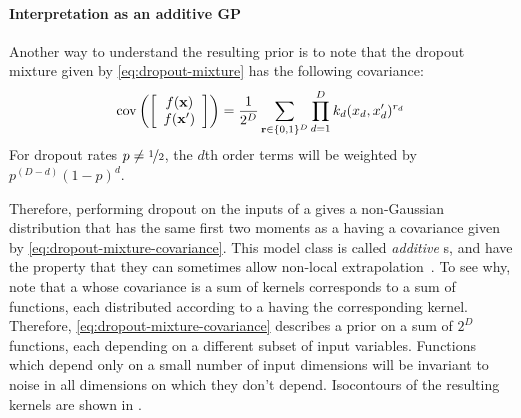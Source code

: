 \documentclass{article} %
\begin{document}
\paragraph{Interpretation as an additive GP}
Another way to understand the resulting prior is to note that the dropout mixture given by \cref{eq:dropout-mixture} has the following covariance:%
%
\begin{align}
\operatorname{cov}\left( \left[ \begin{array}{c} {f({\bf{x}})} \\ {f({\bf{x}}')} \end{array} \right] \right) = \frac{1}{2^{D}} \sum_{{\bf{r}} \in \{0,1\}^D}  \prod_{d=1}^D k_d(x_d, x_d')^{r_d}
\label{eq:dropout-mixture-covariance}
\end{align}
%
For dropout rates $p \neq \nicefrac{1}{2}$, the $d$th order terms will be weighted by $p^{(D - d)}(1-p)^d$.

Therefore, performing dropout on the inputs of a \gp{} gives a non-Gaussian distribution that has the same first two moments as a \gp{} having a covariance given by \cref{eq:dropout-mixture-covariance}.
This model class is called \emph{additive} \gp{}s, and have the property that they can sometimes allow non-local extrapolation~\citep{duvenaud2011additive11}.
To see why, note that a \gp{} whose covariance is a sum of kernels corresponds to a sum of functions, each distributed according to a \gp{} having the corresponding kernel.
Therefore, \cref{eq:dropout-mixture-covariance} describes a prior on a sum of $2^D$ functions, each depending on a different subset of input variables.
Functions which depend only on a small number of input dimensions will be invariant to noise in all dimensions on which they don't depend.
Isocontours of the resulting kernels are shown in .
\end{document}
